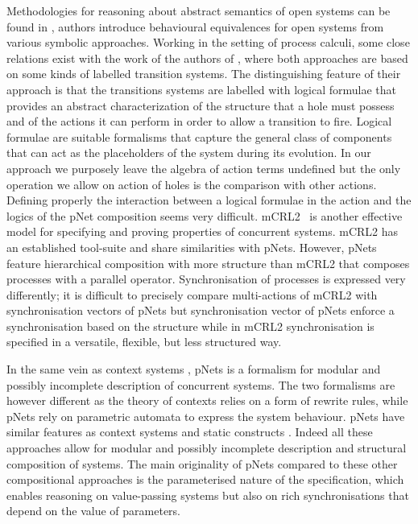 \documentclass{elsarticle}
\newcommand{\TODO}[1]{\textcolor{red}{\textbf{[TODO:#1]}}}
\begin{document}

Methodologies for reasoning about abstract semantics of open systems can be found in \cite{BaldanBB:2002, BaldanBB:07,Dubut:20}, authors introduce  behavioural equivalences for open systems from various symbolic approaches. Working in the setting of process calculi, some close relations  exist with the work  of the authors of \cite{BaldanBB:2002,BaldanBB:07}, where both approaches are based
on some kinds of labelled transition systems. The distinguishing feature of their approach is that the transitions systems are labelled with logical formulae that provides  an abstract characterization of the structure that a hole must possess and of the actions it can perform in order to allow a transition to fire. Logical formulae are suitable formalisms that capture the general class of components that can act as the placeholders of the system during its evolution. In our approach we purposely leave the algebra of action terms undefined but the only operation we allow on action of holes is the comparison with other actions. Defining properly the interaction between a logical formulae in the action and the logics of the pNet composition seems very difficult.
mCRL2~\cite{mCRLFACS:2020} is another effective model for specifying and proving properties of concurrent systems. mCRL2 has an established tool-suite and share similarities with pNets. However, pNets feature hierarchical composition with more structure than mCRL2 that composes processes with a parallel operator. Synchronisation of processes is expressed very differently; it is difficult to precisely compare multi-actions of mCRL2 with synchronisation vectors of pNets but synchronisation vector of pNets enforce a  synchronisation based on the structure while in mCRL2 synchronisation is specified in a versatile, flexible, but less structured way.

In the same vein as  context systems \cite{Larsen:91}, pNets is a formalism for modular and possibly incomplete  description of concurrent systems. The two formalisms are however different as the theory of contexts relies on a form of rewrite rules, while  pNets rely on parametric automata to express the system behaviour.  
pNets have similar features as context systems \cite{Larsen:91} and static constructs \cite{HuttelL89}. Indeed all these approaches allow for modular and possibly incomplete  description   and  structural composition of systems. The main originality of pNets  compared to these other compositional approaches is the parameterised nature of the specification, which enables reasoning on value-passing systems but also on rich synchronisations that depend on the value of parameters.
\end{document}
